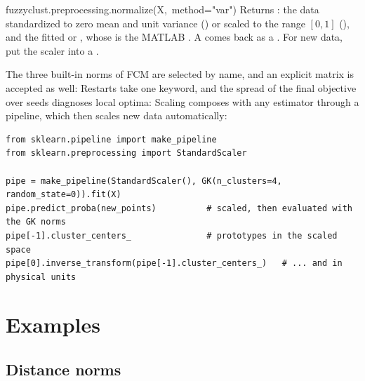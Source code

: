 \begin{apibox}{fuzzyclust.preprocessing.normalize(\allowbreak X,\allowbreak\ method="var")}
Returns : the data standardized to zero mean and unit variance () or scaled to the range $[0,1]$ (), and the fitted  or , whose  is the MATLAB . A  comes back as a . For new data, put the scaler into a .
\end{apibox}

The three built-in norms of FCM are selected by name, and an explicit matrix is accepted as well:
Restarts take one keyword, and the spread of the final objective over seeds diagnoses local optima:
Scaling composes with any estimator through a pipeline, which then scales new data automatically:
\begin{lstlisting}
from sklearn.pipeline import make_pipeline
from sklearn.preprocessing import StandardScaler

pipe = make_pipeline(StandardScaler(), GK(n_clusters=4, random_state=0)).fit(X)
pipe.predict_proba(new_points)          # scaled, then evaluated with the GK norms
pipe[-1].cluster_centers_               # prototypes in the scaled space
pipe[0].inverse_transform(pipe[-1].cluster_centers_)   # ... and in physical units
\end{lstlisting}

\section{Examples}\label{sec:found:examples}

\subsection{Distance norms}\label{sec:found:ex:norms}


